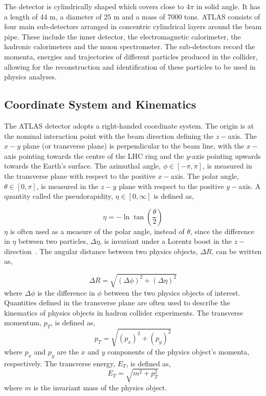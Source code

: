 The detector is cylindrically shaped which covers close to 4$\pi$ in solid angle. It has a length of 44 m, a diameter of 25 m and a mass of 7000 tons. ATLAS consists of four main sub-detectors arranged in concentric cylindrical layers around the beam pipe. These include the inner detector, the electromagnetic calorimeter, the hadronic calorimeters and the muon spectrometer. The sub-detectors record the momenta, energies and trajectories of different particles produced in the collider, allowing for the reconstruction and identification of these particles to be used in physics analyses.

\subsection{Coordinate System and Kinematics}

The ATLAS detector adopts a right-handed coordinate system. The origin is at the nominal interaction point with the beam direction defining the $z-$axis. The $x-y$ plane (or transverse plane) is perpendicular to the beam line, with the $x-$axis pointing towards the centre of the LHC ring and the $y$-axis pointing upwards towards the Earth's surface. The azimuthal angle, $\phi \in [-\pi, \pi]$, is measured in the transverse plane with respect to the positive $x-$axis. The polar angle, $\theta \in [0,\pi]$, is measured in the $z-y$ plane with respect to the positive $y-$axis. A quantity called the pseudorapidity, $\eta \in [0,\infty]$ is defined as,

\begin{equation}
\eta = -\ln{\tan{\left(\frac{\theta}{2}\right)}}
\end{equation}
$\eta$ is often used as a measure of the polar angle, instead of $\theta$, since the difference in $\eta$ between two particles, $\Delta \eta$, is invariant under a Lorentz boost in the $z-$direction~\cite{Tovey_2019}. The angular distance between two physics objects, $\Delta R$, can be written as,

\begin{equation}
\Delta R = \sqrt{(\Delta\phi)^{2} + (\Delta\eta)^{2}}
\end{equation}
where $\Delta\phi$ is the difference in $\phi$ between the two physics objects of interest. Quantities defined in the transverse plane are often used to describe the kinematics of physics objects in hadron collider experiments. The transverse momentum, $p_{T}$, is defined as,
\begin{equation}
p_{T}= \sqrt{(p_{x})^{2} + (p_{y})^{2}}
\end{equation}
where $p_{x}$ and $p_{y}$ are the $x$ and $y$ components of the physics object's momenta, respectively. The transverse energy, $E_{T}$, is defined as,
\begin{equation}
E_{T} = \sqrt{m^{2} + p_{T}^{2}}
\end{equation}
where $m$ is the invariant mass of the physics object. 

